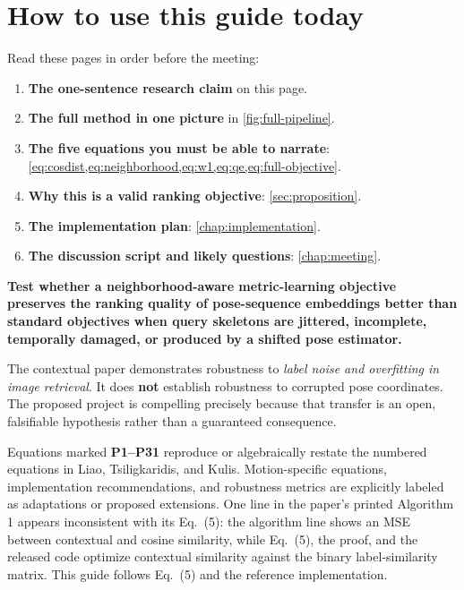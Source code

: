 \documentclass[11pt,oneside,openany]{book}
\theoremstyle{myplain}
\theoremstyle{definition}
\begin{document}
\frontmatter
\chapter*{How to use this guide today}

\begin{meetingbox}[title=The 12-minute route]
Read these pages in order before the meeting:
\begin{enumerate}[leftmargin=*,itemsep=2pt]
  \item \textbf{The one-sentence research claim} on this page.
  \item \textbf{The full method in one picture} in \cref{fig:full-pipeline}.
  \item \textbf{The five equations you must be able to narrate}: \cref{eq:cosdist,eq:neighborhood,eq:w1,eq:qe,eq:full-objective}.
  \item \textbf{Why this is a valid ranking objective}: \cref{sec:proposition}.
  \item \textbf{The implementation plan}: \cref{chap:implementation}.
  \item \textbf{The discussion script and likely questions}: \cref{chap:meeting}.
\end{enumerate}
\end{meetingbox}

\begin{conceptbox}[title=The one-sentence research claim]
\textbf{Test whether a neighborhood-aware metric-learning objective preserves the ranking quality of pose-sequence embeddings better than standard objectives when query skeletons are jittered, incomplete, temporally damaged, or produced by a shifted pose estimator.}
\end{conceptbox}

\begin{warningbox}[title=The scientific boundary]
The contextual paper demonstrates robustness to \emph{label noise and overfitting in image retrieval}. It does \textbf{not} establish robustness to corrupted pose coordinates. The proposed project is compelling precisely because that transfer is an open, falsifiable hypothesis rather than a guaranteed consequence.
\end{warningbox}

\begin{paperbox}[title=Source-fidelity note]
Equations marked \textbf{P1--P31} reproduce or algebraically restate the numbered equations in Liao, Tsiligkaridis, and Kulis. Motion-specific equations, implementation recommendations, and robustness metrics are explicitly labeled as adaptations or proposed extensions. One line in the paper's printed Algorithm 1 appears inconsistent with its Eq.~(5): the algorithm line shows an MSE between contextual and cosine similarity, while Eq.~(5), the proof, and the released code optimize contextual similarity against the binary label-similarity matrix. This guide follows Eq.~(5) and the reference implementation.
\end{paperbox}
\end{document}
